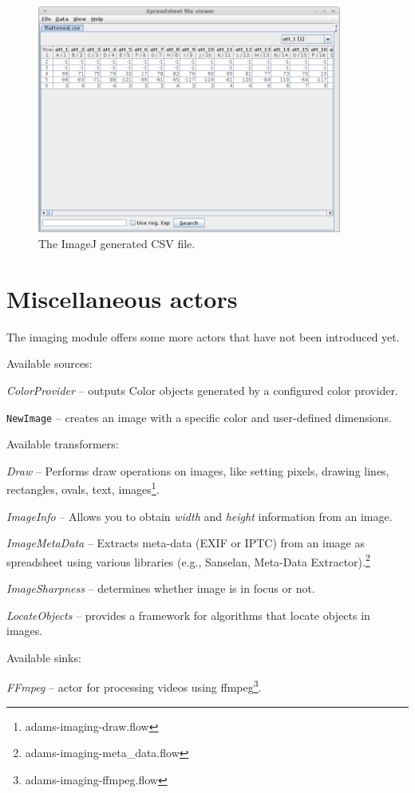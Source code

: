 \documentclass[a4paper]{book}
\begin{document}
\begin{figure}[htb]
  \centering
  \includegraphics[width=10.0cm]{images/imagej-csv-generation-dataset.png}
  \caption{The ImageJ generated CSV file.}
  \label{imagej-csv-generation-dataset}
\end{figure}


\chapter{Miscellaneous actors}
The imaging module offers some more actors that have not been introduced yet.

\noindent Available sources:
\begin{tight_itemize}
	\item \textit{ColorProvider} -- outputs Color objects generated by a 
	configured color provider.
    \item \texttt{NewImage} -- creates an image with a specific color and
    user-defined dimensions.
\end{tight_itemize}

\noindent Available transformers:
\begin{tight_itemize}
	\item \textit{Draw} -- Performs draw operations on images, like setting 
	pixels, drawing lines, rectangles, ovals, text, images\footnote{adams-imaging-draw.flow}.
	\item \textit{ImageInfo} -- Allows you to obtain \textit{width} and
	\textit{height} information from an image.
	\item \textit{ImageMetaData} -- Extracts meta-data (EXIF or IPTC) from an
	image as spreadsheet using various libraries (e.g., Sanselan\cite{sanselan}, 
	Meta-Data Extractor\cite{metadataextractor}).\footnote{adams-imaging-meta\_data.flow}
	\item \textit{ImageSharpness} -- determines whether image is in focus or not.
	\item \textit{LocateObjects} -- provides a framework for algorithms that
	locate objects in images.
\end{tight_itemize}

\noindent Available sinks:
\begin{tight_itemize}
  \item \textit{FFmpeg} -- actor for processing videos using
  ffmpeg\cite{ffmpeg}\footnote{adams-imaging-ffmpeg.flow}.
\end{tight_itemize}



\end{document}
